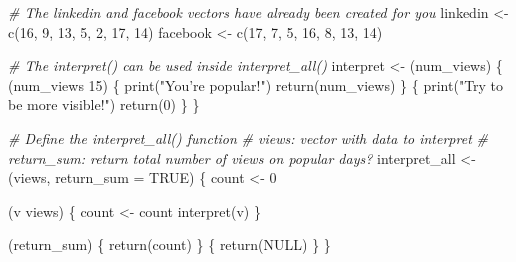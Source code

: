 \documentclass[]{article}
\newcommand{\hlnum}[1]{\textcolor[rgb]{0.816,0.125,0.439}{#1}}%
\newcommand{\hlstr}[1]{\textcolor[rgb]{0.251,0.627,0.251}{#1}}%
\newcommand{\hlcom}[1]{\textcolor[rgb]{0.502,0.502,0.502}{\textit{#1}}}%
\newcommand{\hlstd}[1]{\textcolor[rgb]{0.251,0.251,0.251}{#1}}%
\newcommand{\hlkwc}[1]{\textcolor[rgb]{0.251,0.251,0.251}{#1}}%
\newcommand{\hlkwd}[1]{\textcolor[rgb]{0.878,0.439,0.125}{#1}}%
\newenvironment{Shaded}{\begin{myshaded}}{\end{myshaded}}
\newcommand{\KeywordTok}[1]{\hlkwd{#1}}
\newcommand{\DataTypeTok}[1]{\hlkwc{#1}}
\newcommand{\DecValTok}[1]{\hlnum{#1}}
\newcommand{\StringTok}[1]{\hlstr{#1}}
\newcommand{\CommentTok}[1]{\hlcom{#1}}
\newcommand{\OtherTok}[1]{{#1}}
\newcommand{\NormalTok}[1]{\hlstd{#1}}
\begin{document}
\begin{Shaded}
\begin{Highlighting}[]
\CommentTok{# The linkedin and facebook vectors have already been created for you}
\NormalTok{linkedin <-}\StringTok{ }\KeywordTok{c}\NormalTok{(}\DecValTok{16}\NormalTok{, }\DecValTok{9}\NormalTok{, }\DecValTok{13}\NormalTok{, }\DecValTok{5}\NormalTok{, }\DecValTok{2}\NormalTok{, }\DecValTok{17}\NormalTok{, }\DecValTok{14}\NormalTok{)}
\NormalTok{facebook <-}\StringTok{ }\KeywordTok{c}\NormalTok{(}\DecValTok{17}\NormalTok{, }\DecValTok{7}\NormalTok{, }\DecValTok{5}\NormalTok{, }\DecValTok{16}\NormalTok{, }\DecValTok{8}\NormalTok{, }\DecValTok{13}\NormalTok{, }\DecValTok{14}\NormalTok{)}

\CommentTok{# The interpret() can be used inside interpret_all()}
\NormalTok{interpret <-}\StringTok{ }\NormalTok{(num_views) \{}
\NormalTok{ (num_views }\OperatorTok{>}\StringTok{ }\DecValTok{15}\NormalTok{) \{}
\KeywordTok{print}\NormalTok{(}\StringTok{"You're popular!"}\NormalTok{)}
\KeywordTok{return}\NormalTok{(num_views)}
\NormalTok{\} }\NormalTok{ \{}
\KeywordTok{print}\NormalTok{(}\StringTok{"Try to be more visible!"}\NormalTok{)}
\KeywordTok{return}\NormalTok{(}\DecValTok{0}\NormalTok{)}
\NormalTok{\}}
\NormalTok{\}}

\CommentTok{# Define the interpret_all() function}
\CommentTok{# views: vector with data to interpret}
\CommentTok{# return_sum: return total number of views on popular days?}
\NormalTok{interpret_all <-}\StringTok{ }\NormalTok{(views, }\DataTypeTok{return_sum =} \OtherTok{TRUE}\NormalTok{) \{}
\NormalTok{count <-}\StringTok{ }\DecValTok{0}

\NormalTok{ (v }\NormalTok{ views) \{}
\NormalTok{count <-}\StringTok{ }\NormalTok{count }\OperatorTok{+}\StringTok{ }\KeywordTok{interpret}\NormalTok{(v)}
\NormalTok{\}}

\NormalTok{ (return_sum) \{}
\KeywordTok{return}\NormalTok{(count)}
\NormalTok{\} }\NormalTok{ \{}
\KeywordTok{return}\NormalTok{(}\OtherTok{NULL}\NormalTok{)}
\NormalTok{\}}
\NormalTok{\}}


\end{Highlighting}
\end{Shaded}
\end{document}
